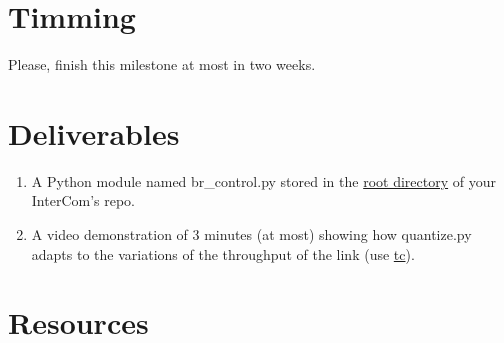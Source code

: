 \section{Timming}

Please, finish this milestone at most in two weeks.

\section{Deliverables}

\begin{enumerate}
  \item A Python module named br\_control.py stored in
    the \href{https://github.com/Tecnologias-multimedia/intercom}{root
    directory} of your InterCom's repo.  \item A video demonstration
    of 3 minutes (at most) showing how quantize.py adapts to the
    variations of the throughput of the link
    (use \href{https://man7.org/linux/man-pages/man8/tc.8.html}{tc}).
\end{enumerate}

\section{Resources}


